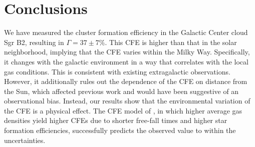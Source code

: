\documentclass[twocolumn]{aastex62}
\begin{document}
\section{Conclusions}
We have measured the cluster formation efficiency in the Galactic Center cloud
Sgr B2, resulting in $\Gamma=37\pm7\%$. This CFE is higher than that in the solar
neighborhood, implying that the CFE varies within the Milky Way. Specifically, it changes with the galactic environment in a way that correlates with the local gas conditions. This is consistent with existing extragalactic observations. However, it additionally rules out the dependence of the CFE on distance from the Sun, which affected previous work and would have been suggestive of an observational bias. Instead, our results show that the environmental variation of the CFE is a physical effect. The CFE model of \citet{Kruijssen2012a}, in which higher average gas densities yield higher CFEs due to shorter free-fall times and higher star formation efficiencies, successfully predicts the observed value to within the uncertainties.





\end{document}
